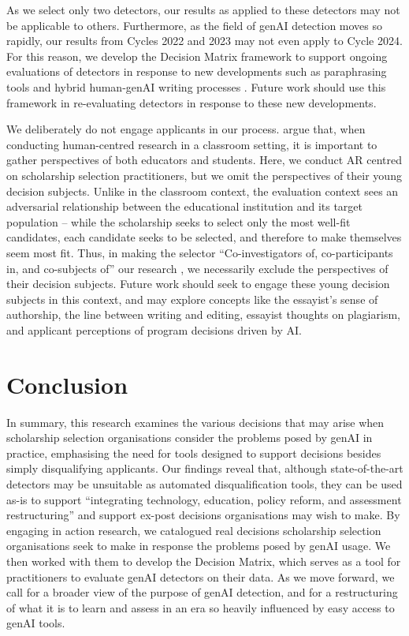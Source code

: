 As we select only two detectors, our results as applied to these detectors may not be applicable to others. Furthermore, as the field of genAI detection moves so rapidly, our results from Cycles 2022 and 2023 may not even apply to Cycle 2024. For this reason, we develop the Decision Matrix framework to support ongoing evaluations of detectors in response to new developments such as paraphrasing tools and hybrid human-genAI writing processes \cite{kalpesh_krishna_paraphrasing_2023}. Future work should use this framework in re-evaluating detectors in response to these new developments.

We deliberately do not engage applicants in our process. \textcite{venn-wycherley_realities_2024} argue that, when conducting human-centred research in a classroom setting, it is important to gather perspectives of both educators and students. Here, we conduct AR centred on scholarship selection practitioners, but we omit the perspectives of their young decision subjects. Unlike in the classroom context, the evaluation context sees an adversarial relationship between the educational institution and its target population – while the scholarship seeks to select only the most well-fit candidates, each candidate seeks to be selected, and therefore to make themselves seem most fit. Thus, in making the selector ``Co-investigators of, co-participants in, and co-subjects of'' our research \cite{Hayes_2011}, we necessarily exclude the perspectives of their decision subjects. Future work should seek to engage these young decision subjects in this context, and may explore concepts like the essayist's sense of authorship, the line between writing and editing, essayist thoughts on plagiarism, and applicant perceptions of program decisions driven by AI.

\section{Conclusion}
In summary, this research examines the various decisions that may arise when scholarship selection organisations consider the problems posed by genAI in practice, emphasising the need for tools designed to support decisions besides simply disqualifying applicants. Our findings reveal that, although state-of-the-art detectors may be unsuitable as automated disqualification tools, they can be used as-is to support ``integrating technology, education, policy reform, and assessment restructuring'' \cite{mike_perkins_decoding_2023} and support ex-post decisions organisations may wish to make. By engaging in action research, we catalogued real decisions scholarship selection organisations seek to make in response the problems posed by genAI usage. We then worked with them to develop the Decision Matrix, which serves as a tool for practitioners to evaluate genAI detectors on their data. As we move forward, we call for a broader view of the purpose of genAI detection, and for a restructuring of what it is to learn and assess in an era so heavily influenced by easy access to genAI tools.